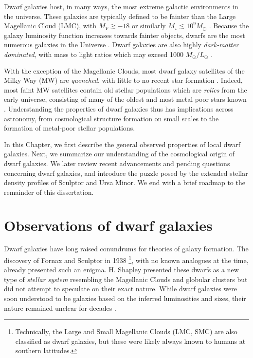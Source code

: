 Dwarf galaxies host, in many ways, the most extreme galactic
environments in the universe. These galaxies are typically defined to be
fainter than the Large Magellanic Cloud (LMC), with \(M_V \gtrsim -18\)
or similarly \(M_\star \lesssim 10^9 M_\odot\)
\citep[e.g.,][]{mcconnachie2012, bullock+boylan-kolchin2017}. Because
the galaxy luminosity function increases towards fainter objects, dwarfs
are the most numerous galaxies in the Universe
\citep[e.g.,][]{blanton+2005, mao+2021}. Dwarf galaxies are also highly
\emph{dark-matter dominated}, with mass to light ratios which may exceed
1000 \(M_\odot/ L_\odot\) \citep[e.g.,][]{simon+geha2007, hayashi+2023}.

With the exception of the Magellanic Clouds, most dwarf galaxy
satellites of the Milky Way (MW) are \emph{quenched}, with little to no
recent star formation \citep[e.g.,][]{weisz+2014}. Indeed, most faint MW
satellites contain old stellar populations which are \emph{relics} from
the early universe, consisting of many of the oldest and most metal poor
stars known \citep{simon2019}. Understanding the properties of dwarf
galaxies thus has implications across astronomy, from cosmological
structure formation on small scales to the formation of metal-poor
stellar populations.

In this Chapter, we first describe the general observed properties of
local dwarf galaxies. Next, we summarize our understanding of the
cosmological origin of dwarf galaxies. We later review recent
advancements and pending questions concerning dwarf galaxies, and
introduce the puzzle posed by the extended stellar density profiles of
Sculptor and Ursa Minor. We end with a brief roadmap to the remainder of
this dissertation.

\section{Observations of dwarf
galaxies}\label{observations-of-dwarf-galaxies}

Dwarf galaxies have long raised conundrums for theories of galaxy
formation. The discovery of Fornax and Sculptor in 1938
\citep{shapley1938}\footnote{Technically, the Large and Small Magellanic
  Clouds (LMC, SMC) are also classified as dwarf galaxies, but these
  were likely always known to humans at southern latitudes.}, with no
known analogues at the time, already presented such an enigma. H.
Shapley presented these dwarfs as a new type of \emph{stellar system}
resembling the Magellanic Clouds and globular clusters but did not
attempt to speculate on their exact nature. While dwarf galaxies were
soon understood to be galaxies based on the inferred luminosities and
sizes, their nature remained unclear for decades
\citep[e.g.,][]{hodge1971, gallagher+wyse1994}.

